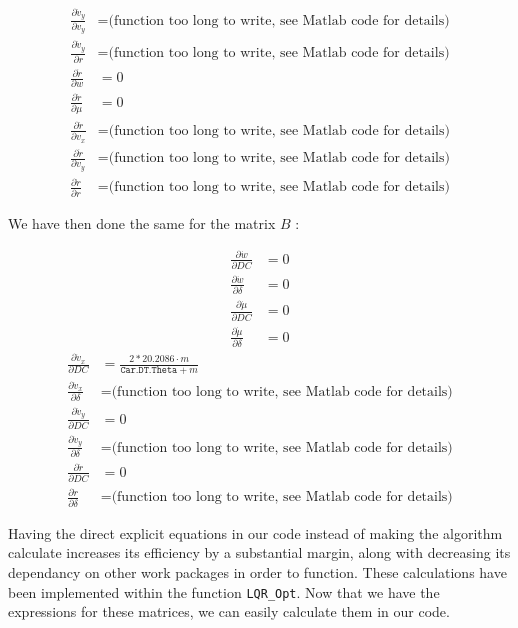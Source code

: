 \documentclass[a4paper, 11pt]{article}
\begin{document}
\begin{adjustwidth}{1cm}{}
\begin{align*}
		\frac{\partial \dot{v}_y}{\partial v_y} &= \text{(function too long to write, see Matlab code for details)}\\
		\frac{\partial \dot{v}_y}{\partial r} &= \text{(function too long to write, see Matlab code for details)}
	\end{align*}
	\begin{align*}
		\frac{\partial \dot{r}}{\partial w} &= 0\\
		\frac{\partial \dot{r}}{\partial \mu} &= 0\\
		\frac{\partial \dot{r}}{\partial v_x} &= \text{(function too long to write, see Matlab code for details)}\\
		\frac{\partial \dot{r}}{\partial v_y} &= \text{(function too long to write, see Matlab code for details)}\\
		\frac{\partial \dot{r}}{\partial r} &= \text{(function too long to write, see Matlab code for details)}
	\end{align*}
\end{adjustwidth}

We have then done the same for the matrix $B$ :
\begin{adjustwidth}{1cm}{}
	\begin{align*}
		\frac{\partial \dot{w}}{\partial DC} &= 0\\
		\frac{\partial \dot{w}}{\partial \delta} &= 0
	\end{align*}
	\begin{align*}
		\frac{\partial \dot{\mu}}{\partial DC} &= 0\\
		\frac{\partial \dot{\mu}}{\partial \delta} &= 0 
	\end{align*}
	\begin{align*}
		\frac{\partial \dot{v}_x}{\partial DC} &= \frac{2*20.2086\cdot m}{\texttt{Car.DT.Theta} + m} \\
		\frac{\partial \dot{v}_x}{\partial \delta} &= \text{(function too long to write, see Matlab code for details)}
	\end{align*}
	\begin{align*}
		\frac{\partial \dot{v}_y}{\partial DC} &= 0\\
		\frac{\partial \dot{v}_y}{\partial \delta} &= \text{(function too long to write, see Matlab code for details)}
	\end{align*}
	\begin{align*}
		\frac{\partial \dot{r}}{\partial DC} &= 0\\
		\frac{\partial \dot{r}}{\partial \delta} &= \text{(function too long to write, see Matlab code for details)}
	\end{align*}
\end{adjustwidth}
\vspace*{1em}
Having the direct explicit equations in our code instead of making the algorithm calculate increases its efficiency by a substantial margin, along with decreasing its dependancy on other work packages in order to function. These calculations have been implemented within the function \texttt{LQR\_Opt}. Now that we have the expressions for these matrices, we can easily calculate them in our code.\\
\end{document}
